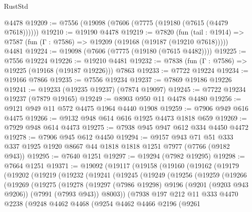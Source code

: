 \begin{lexlean}{RustStd}
\begin{coremodule}
    @4478
@19209 := @7556 (@19098 (@7606 (@7775 (@19180 (@7615 (@4479 @7618))))))
@19210 := @19190 @4478
@19219 := @7820
    (fun (tail : @1914) => @7587 (fun (Γ : @7586) => @19209 (@19168 (@19187 (@19210 @7618)))))
    @4481
@19224 := @19098 (@7606 (@7775 (@19180 (@7615 @4482))))
@19225 := @7556 @19224
@19226 := @19210 @4481
@19232 := @7838 (fun (Γ : @7586) => @19225 (@19168 (@19187 @19226))) @7863
@19233 := @7722 @19224
@19234 := @19166 @7866
@19235 := @7556 @19234
@19237 := @7869 @19186 @19226
@19241 := @19233 (@19235 @19237) (@7874 @19097)
@19245 := @7722 @19234 @19237 (@7879 @19165)
@19249 := @8903 @950 @11 @4478 @4480
@19256 := @9121 @949 @11 @572 @4475 @1964 @4440 @1908
@19259 := @7906 @949 @616 @4475
@19266 := @9132 @948 @614 @616 @1925 @4473 @1818 @659
@19269 := @7929 @948 @614 @4473
@19275 := @7938 @945 @947 @612 @334 @4450 @4472
@19278 := @7906 @945 @612 @4450
@19294 := @9157
    @943
    @71
    @51
    @333
    @337
    @1925
    @1920
    @8667
    @44
    @1818
    @1818
    @1251
    @7977
    (@7766 (@9182 @943))
@19295 := @7640 @1251
@19297 := @19294 (@7982 @19295)
@19298 := @7664 @1251
@19371 := @19092
    (@19117
      (@19158
        (@19160
          (@19162
            (@19179
              (@19202
                (@19219
                  (@19232
                    (@19241
                      (@19245
                        (@19249
                          (@19256
                            (@19259
                              (@19266
                                (@19269
                                  (@19275
                                    (@19278
                                      (@19297
                                        (@7986 @19298)
                                        @9196
                                        (@9201 (@9203 @943 @9206))
                                        (@7991 (@7993 @943))
                                        @8003))
                                    (@7938
                                      @197
                                      @212
                                      @11
                                      @333
                                      @4470
                                      @2238
                                      (@9248
                                        @4462
                                        @4468
                                        (@9254
                                          @4462
                                          @4466
                                          @2196
                                          (@9261

\end{coremodule}
\end{lexlean}
